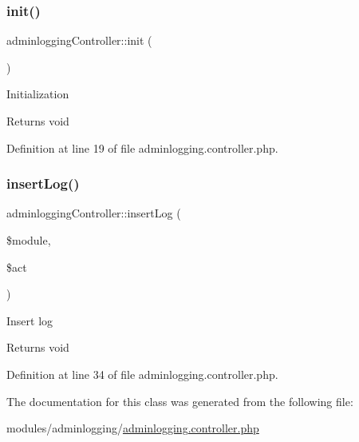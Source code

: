 \subsubsection{\texorpdfstring{init()}{init()}}
{\footnotesize\ttfamily adminlogging\+Controller\+::init (\begin{DoxyParamCaption}{ }\end{DoxyParamCaption})}

Initialization \begin{DoxyReturn}{Returns}
void 
\end{DoxyReturn}


Definition at line 19 of file adminlogging.\+controller.\+php.

\mbox{\label{classadminloggingController_aaf6283ad1e303a0b8f475013f442c20a}} 
\subsubsection{\texorpdfstring{insert\+Log()}{insertLog()}}
{\footnotesize\ttfamily adminlogging\+Controller\+::insert\+Log (\begin{DoxyParamCaption}\item[{}]{\$module,  }\item[{}]{\$act }\end{DoxyParamCaption})}

Insert log \begin{DoxyReturn}{Returns}
void 
\end{DoxyReturn}


Definition at line 34 of file adminlogging.\+controller.\+php.



The documentation for this class was generated from the following file\+:\begin{DoxyCompactItemize}
\item 
modules/adminlogging/\hyperlink{adminlogging_8controller_8php}{adminlogging.\+controller.\+php}\end{DoxyCompactItemize}
